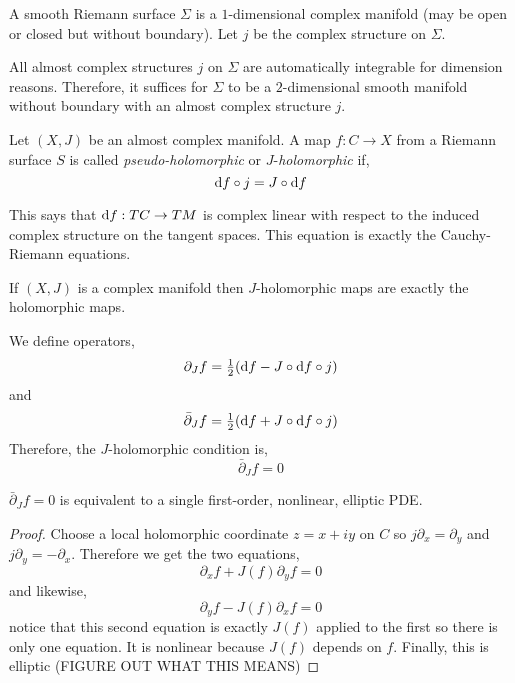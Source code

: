 \documentclass[12pt]{article}
\newcommand{\dbar}{\bar{\partial}}
\begin{document}
\begin{defn}
A smooth Riemann surface $\Sigma$ is a $1$-dimensional complex manifold (may be open or closed but without boundary). Let $j$ be the complex structure on $\Sigma$. 
\end{defn}

\begin{rmk}
All almost complex structures $j$ on $\Sigma$ are automatically integrable for dimension reasons. Therefore, it suffices for $\Sigma$ to be a $2$-dimensional smooth manifold without boundary with an almost complex structure $j$. 
\end{rmk}

\begin{defn}
Let $(X, J)$ be an almost complex manifold. A map $f : C \to X$ from a Riemann surface $S$ is called \textit{pseudo-holomorphic} or $J$-\textit{holomorphic} if,
\[ \mathrm{d}{f} \circ j = J \circ \mathrm{d}{f} \]
\end{defn}

\begin{rmk}
This says that $\mathrm{d}{f} : TC \to TM$ is complex linear with respect to the induced complex structure on the tangent spaces. This equation is exactly the Cauchy-Riemann equations. 
\end{rmk}

\begin{rmk}
If $(X, J)$ is a complex manifold then $J$-holomorphic maps are exactly the holomorphic maps.
\end{rmk}

\begin{defn}
We define operators,
\[ \partial_J f = \tfrac{1}{2} (\mathrm{d}{f}  - J \circ \mathrm{d}{f} \circ j) \]
and
\[ \dbar_J f = \tfrac{1}{2} (\d{f} + J \circ \d{f} \circ j) \]
Therefore, the $J$-holomorphic condition is,
\[ \dbar_J f = 0 \]
\end{defn}

\begin{prop}
$\dbar_J f = 0$ is equivalent to a single first-order, nonlinear, elliptic PDE. 
\end{prop}

\begin{proof}
Choose a local holomorphic coordinate $z = x + i y$ on $C$ so $j \partial_x = \partial_y$ and $j \partial_y = - \partial_x$. Therefore we get the two equations,
\[ \partial_x f + J(f) \partial_y f = 0 \]
and likewise,
\[ \partial_y f  - J(f) \partial_x f = 0 \]
notice that this second equation is exactly $J(f)$ applied to the first so there is only one equation. It is nonlinear because $J(f)$ depends on $f$. Finally, this is elliptic (FIGURE OUT WHAT THIS MEANS)
\end{proof}
\end{document}
